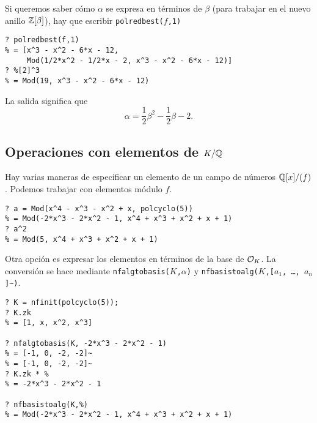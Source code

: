 Si queremos saber cómo $\alpha$ se expresa en términos de $\beta$ (para trabajar
en el nuevo anillo $\mathbb{Z} [\beta]$), hay que escribir \texttt{polredbest($f$,1)}

\begin{shaded}
\begin{verbatim}
? polredbest(f,1)
% = [x^3 - x^2 - 6*x - 12,
     Mod(1/2*x^2 - 1/2*x - 2, x^3 - x^2 - 6*x - 12)]
? %[2]^3
% = Mod(19, x^3 - x^2 - 6*x - 12)
\end{verbatim}
\end{shaded}

La salida significa que
$$\alpha = \frac{1}{2}\beta^2 - \frac{1}{2}\beta - 2.$$

\subsection{Operaciones con elementos de $K/\mathbb{Q}$}

Hay varias maneras de especificar un elemento de un campo de números
$\mathbb{Q}[x]/(f)$. Podemos trabajar con elementos módulo $f$.

\begin{shaded}
\begin{verbatim}
? a = Mod(x^4 - x^3 - x^2 + x, polcyclo(5))
% = Mod(-2*x^3 - 2*x^2 - 1, x^4 + x^3 + x^2 + x + 1)
? a^2
% = Mod(5, x^4 + x^3 + x^2 + x + 1)
\end{verbatim}
\end{shaded}

Otra opción es expresar los elementos en términos de la base de $\mathcal{O}_K$.
La conversión se hace mediante \texttt{nfalgtobasis($K$,$\alpha$)}
y \texttt{nfbasistoalg($K$,[$a_1$, \ldots, $a_n$]\textasciitilde)}.

\begin{shaded}
\begin{verbatim}
? K = nfinit(polcyclo(5));
? K.zk
% = [1, x, x^2, x^3]

? nfalgtobasis(K, -2*x^3 - 2*x^2 - 1)
% = [-1, 0, -2, -2]~
% = [-1, 0, -2, -2]~
? K.zk * %
% = -2*x^3 - 2*x^2 - 1

? nfbasistoalg(K,%)
% = Mod(-2*x^3 - 2*x^2 - 1, x^4 + x^3 + x^2 + x + 1)
\end{verbatim}
\end{shaded}


